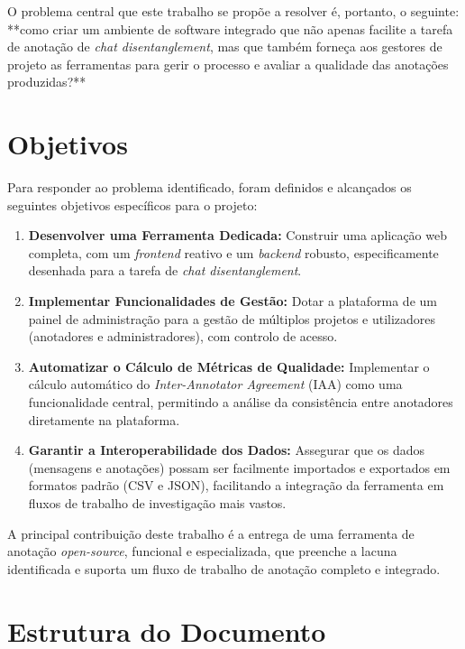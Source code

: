 O problema central que este trabalho se propõe a resolver é, portanto, o seguinte: **como criar um ambiente de software integrado que não apenas facilite a tarefa de anotação de \textit{chat disentanglement}, mas que também forneça aos gestores de projeto as ferramentas para gerir o processo e avaliar a qualidade das anotações produzidas?**


\section{Objetivos}

Para responder ao problema identificado, foram definidos e alcançados os seguintes objetivos específicos para o projeto:

\begin{enumerate}
    \item \textbf{Desenvolver uma Ferramenta Dedicada:} Construir uma aplicação web completa, com um \textit{frontend} reativo e um \textit{backend} robusto, especificamente desenhada para a tarefa de \textit{chat disentanglement}.
    
    \item \textbf{Implementar Funcionalidades de Gestão:} Dotar a plataforma de um painel de administração para a gestão de múltiplos projetos e utilizadores (anotadores e administradores), com controlo de acesso.
    
    \item \textbf{Automatizar o Cálculo de Métricas de Qualidade:} Implementar o cálculo automático do \textit{Inter-Annotator Agreement} (IAA) como uma funcionalidade central, permitindo a análise da consistência entre anotadores diretamente na plataforma.
    
    \item \textbf{Garantir a Interoperabilidade dos Dados:} Assegurar que os dados (mensagens e anotações) possam ser facilmente importados e exportados em formatos padrão (CSV e JSON), facilitando a integração da ferramenta em fluxos de trabalho de investigação mais vastos.
\end{enumerate}

A principal contribuição deste trabalho é a entrega de uma ferramenta de anotação \textit{open-source}, funcional e especializada, que preenche a lacuna identificada e suporta um fluxo de trabalho de anotação completo e integrado.

\section{Estrutura do Documento}

